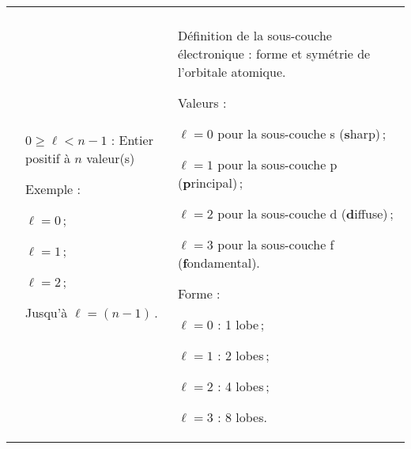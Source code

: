 \begin{xltabular}{\textwidth}{X p{5.5cm} p{7.5cm}}
\addlinespace %
 \\
\middashrule %
& 
\begin{tabdescription}
	\item[$0\ge \ell<n-1$ :] Entier positif à $n$ valeur(s)
 	\item[Exemple :]\hfill
 		\begin{compactitemize}
 			\item $\ell=0$\,;
			\item $\ell=1$\,;
 			\item $\ell=2$\,;
 			\item Jusqu'à $\ell=(n-1)$\,.
		\end{compactitemize}
\end{tabdescription} 
&
\begin{tabdescription}
	\item[Définition de la sous-couche électronique :] forme et symétrie de l'orbitale atomique.  
	\item[Valeurs :]\hfill
		\begin{compactitemize}
			\item $\ell=0$ pour la sous-couche s (\textbf{s}harp)\,;
			\item $\ell=1$ pour la sous-couche p (\textbf{p}rincipal)\,;
			\item $\ell=2$ pour la sous-couche d (\textbf{d}iffuse)\,;
			\item $\ell=3$ pour la sous-couche f  (\textbf{f}ondamental).
		\end{compactitemize}
	\item[Forme :]\hfill
		\begin{tabdescription}
			\item[$\ell=0$ :] 1 lobe\,;
			\item[$\ell=1$ :] 2 lobes\,;
			\item[$\ell=2$ :] 4 lobes\,;
			\item[$\ell=3$ :] 8 lobes.
		\end{tabdescription}
\end{tabdescription} \\



\end{xltabular}
